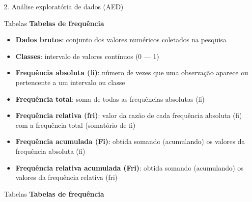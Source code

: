 \documentclass[
  ignorenonframetext,
]{beamer}
\begin{document}
\begin{frame}[fragile]{2. Análise exploratória de dados (AED)}
\begin{block}{Tabelas}
\protect\hypertarget{tabelas}{}
\textbf{Tabelas de frequência}

\begin{itemize}
\item
  \textbf{Dados brutos}: conjunto dos valores numéricos coletados na
  pesquisa
\item
  \textbf{Classes}: intervalo de valores contínuos (0 \textbar--- 1)
\item
  \textbf{Frequência absoluta (fi)}: número de vezes que uma observação
  aparece ou pertencente a um intervalo ou classe
\item
  \textbf{Frequência total}: soma de todas as frequências absolutas (fi)
\item
  \textbf{Frequência relativa (fri)}: valor da razão de cada frequência
  absoluta (fi) com a frequência total (somatório de fi)
\item
  \textbf{Frequência acumulada (Fi)}: obtida somando (acumulando) os
  valores da frequência absoluta (fi)
\item
  \textbf{Frequência relativa acumulada (Fri)}: obtida somando
  (acumulando) os valores da frequência relativa (fri)
\end{itemize}
\end{block}

\begin{block}{Tabelas}
\protect\hypertarget{tabelas-1}{}
\textbf{Tabelas de frequência}


\end{block}
\end{frame}
\end{document}
